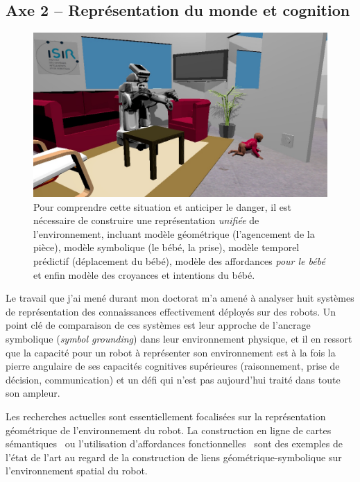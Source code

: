 \documentclass[a4paper]{article}
\begin{document}
\subsection*{Axe 2 -- Représentation du monde et cognition}

\begin{figure}
\includegraphics[width=\textwidth]{figs/robots_home_baby_socket.jpg}
\caption{Pour comprendre cette situation et anticiper le danger, il est
    nécessaire de construire une représentation \emph{unifiée} de
    l'environnement, incluant modèle géométrique (l'agencement de la pièce), modèle
    symbolique (le bébé, la prise), modèle temporel prédictif (déplacement du
    bébé), modèle des affordances \emph{pour le bébé} et enfin modèle des
    croyances et intentions du bébé.}
\label{babyplug}
\end{figure}

Le travail que j'ai mené durant mon doctorat m'a amené à analyser huit systèmes
de représentation des connaissances effectivement déployés sur des robots. Un
point clé de comparaison de ces systèmes est leur approche de l'ancrage
symbolique (\emph{symbol grounding}) dans leur environnement physique, et il en
ressort que la capacité pour un robot à représenter son environnement est à la
fois la pierre angulaire de ses capacités cognitives supérieures (raisonnement,
prise de décision, communication) et un défi qui n'est pas aujourd'hui traité
dans toute son ampleur.

Les recherches actuelles sont essentiellement focalisées sur la représentation
géométrique de l'environnement du robot. La construction en ligne de
cartes sémantiques~\cite{Nuechter2008, Galindo2008,
Blodow2011} ou l'utilisation d'affordances fonctionnelles~\cite{Varadarajan2011}
sont des exemples de l'état de l'art au regard de la construction de liens
géométrique-symbolique sur l'environnement spatial du robot.
\end{document}
